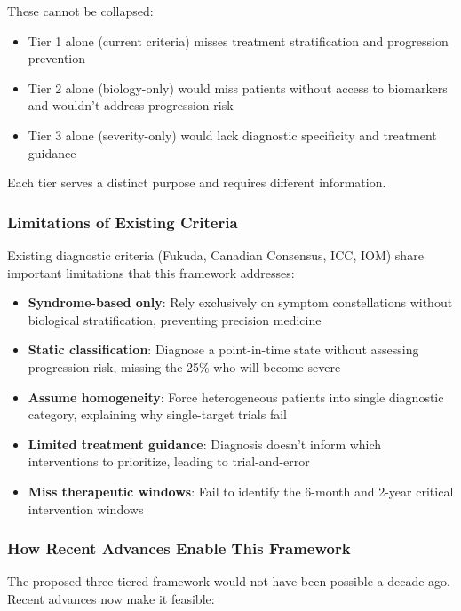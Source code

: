 These cannot be collapsed:
\begin{itemize}
    \item Tier 1 alone (current criteria) misses treatment stratification and progression prevention
    \item Tier 2 alone (biology-only) would miss patients without access to biomarkers and wouldn't address progression risk
    \item Tier 3 alone (severity-only) would lack diagnostic specificity and treatment guidance
\end{itemize}

Each tier serves a distinct purpose and requires different information.

\subsubsection{Limitations of Existing Criteria}

Existing diagnostic criteria (Fukuda, Canadian Consensus, ICC, IOM) share important limitations that this framework addresses:

\begin{itemize}
    \item \textbf{Syndrome-based only}: Rely exclusively on symptom constellations without biological stratification, preventing precision medicine
    \item \textbf{Static classification}: Diagnose a point-in-time state without assessing progression risk, missing the 25\% who will become severe
    \item \textbf{Assume homogeneity}: Force heterogeneous patients into single diagnostic category, explaining why single-target trials fail
    \item \textbf{Limited treatment guidance}: Diagnosis doesn't inform which interventions to prioritize, leading to trial-and-error
    \item \textbf{Miss therapeutic windows}: Fail to identify the 6-month and 2-year critical intervention windows
\end{itemize}

\subsubsection{How Recent Advances Enable This Framework}

The proposed three-tiered framework would not have been possible a decade ago. Recent advances now make it feasible:

